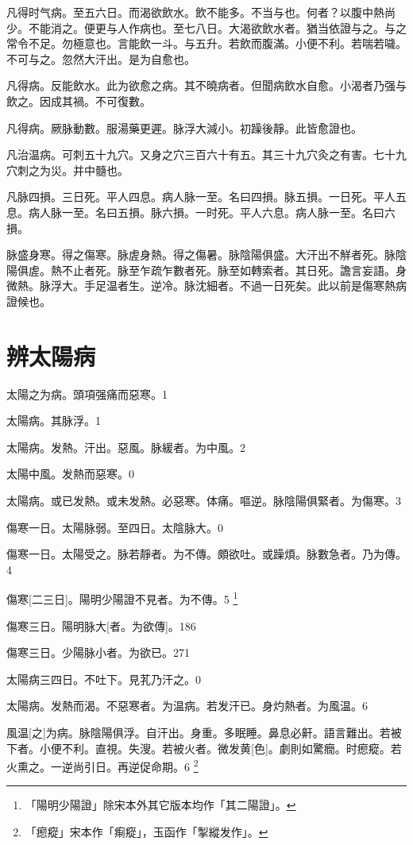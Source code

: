 \documentclass[12pt,twoside,UTF8,b5paper]{ctexbook}
\begin{document}
凡得时气病。至五六日。而渴欲飲水。飲不能多。不当与也。何者？以腹中熱尚少。不能消之。便更与人作病也。至七八日。大渴欲飲水者。猶当依證与之。与之常令不足。勿極意也。言能飲一斗。与五升。若飲而腹滿。小便不利。若喘若噦。不可与之。忽然大汗出。是为自愈也。

凡得病。反能飲水。此为欲愈之病。其不曉病者。但聞病飲水自愈。小渴者乃强与飲之。因成其禍。不可復數。

凡得病。厥脉動數。服湯藥更遲。脉浮大減小。初躁後靜。此皆愈證也。

凡治温病。可刺五十九穴。又身之穴三百六十有五。其三十九穴灸之有害。七十九穴刺之为災。并中髓也。

凡脉四損。三日死。平人四息。病人脉一至。名曰四損。脉五損。一日死。平人五息。病人脉一至。名曰五損。脉六損。一时死。平人六息。病人脉一至。名曰六損。

脉盛身寒。得之傷寒。脉虗身熱。得之傷暑。脉陰陽俱盛。大汗出不觧者死。脉陰陽俱虗。熱不止者死。脉至乍疏乍數者死。脉至如轉索者。其日死。譫言妄語。身微熱。脉浮大。手足温者生。逆冷。脉沈細者。不過一日死矣。此以前是傷寒熱病證候也。

\chapter{辨太陽病}

太陽之为病。頭項强痛而惡寒。1

太陽病。其脉浮。1

太陽病。发熱。汗出。惡風。脉緩者。为中風。2

太陽中風。发熱而惡寒。0

太陽病。或已发熱。或未发熱。必惡寒。体痛。嘔逆。脉陰陽俱緊者。为傷寒。3

傷寒一日。太陽脉弱。至四日。太陰脉大。0

傷寒一日。太陽受之。脉若靜者。为不傳。頗欲吐。或躁煩。脉數急者。乃为傳。4

傷寒[二三日]。陽明少陽證不見者。为不傳。5
	\footnote{「陽明少陽證」除宋本外其它版本均作「其二陽證」。}

傷寒三日。陽明脉大[者。为欲傳]。186

傷寒三日。少陽脉小者。为欲已。271

太陽病三四日。不吐下。見芤乃汗之。0

太陽病。发熱而渴。不惡寒者。为温病。若发汗已。身灼熱者。为風温。6

風温[之]为病。脉陰陽俱浮。自汗出。身重。多眠睡。鼻息必鼾。語言難出。若被下者。小便不利。直視。失溲。若被火者。微发黄[色]。劇則如驚癇。时瘛瘲。若火熏之。一逆尚引日。再逆促命期。6
	\footnote{「瘛瘲」宋本作「痸瘲」，玉函作「掣縱发作」。}
\end{document}
